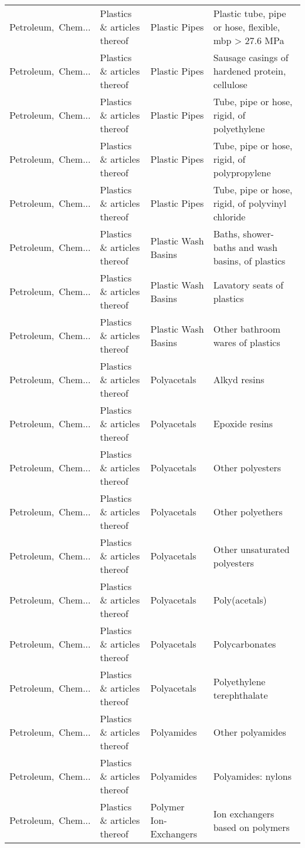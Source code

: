 \begin{appendices}
\begin{xltabular}{\textwidth}{|p{0.10\textwidth}|p{0.25\textwidth}|p{0.24\textwidth}|p{0.31\textwidth}|}
Petroleum,\ Chem... & Plastics \& articles thereof & Plastic Pipes & Plastic tube, pipe or hose, flexible, mbp > 27.6 MPa \\
Petroleum,\ Chem... & Plastics \& articles thereof & Plastic Pipes & Sausage casings of hardened protein, cellulose \\
Petroleum,\ Chem... & Plastics \& articles thereof & Plastic Pipes & Tube, pipe or hose, rigid, of polyethylene \\
Petroleum,\ Chem... & Plastics \& articles thereof & Plastic Pipes & Tube, pipe or hose, rigid, of polypropylene \\
Petroleum,\ Chem... & Plastics \& articles thereof & Plastic Pipes & Tube, pipe or hose, rigid, of polyvinyl chloride \\
Petroleum,\ Chem... & Plastics \& articles thereof & Plastic Wash Basins & Baths, shower-baths and wash basins, of plastics \\
Petroleum,\ Chem... & Plastics \& articles thereof & Plastic Wash Basins & Lavatory seats of plastics \\
Petroleum,\ Chem... & Plastics \& articles thereof & Plastic Wash Basins & Other bathroom wares of plastics \\
Petroleum,\ Chem... & Plastics \& articles thereof & Polyacetals & Alkyd resins \\
Petroleum,\ Chem... & Plastics \& articles thereof & Polyacetals & Epoxide resins \\
Petroleum,\ Chem... & Plastics \& articles thereof & Polyacetals & Other polyesters \\
Petroleum,\ Chem... & Plastics \& articles thereof & Polyacetals & Other polyethers \\
Petroleum,\ Chem... & Plastics \& articles thereof & Polyacetals & Other unsaturated polyesters \\
Petroleum,\ Chem... & Plastics \& articles thereof & Polyacetals & Poly(acetals) \\
Petroleum,\ Chem... & Plastics \& articles thereof & Polyacetals & Polycarbonates \\
Petroleum,\ Chem... & Plastics \& articles thereof & Polyacetals & Polyethylene terephthalate \\
Petroleum,\ Chem... & Plastics \& articles thereof & Polyamides & Other polyamides \\
Petroleum,\ Chem... & Plastics \& articles thereof & Polyamides & Polyamides: nylons \\
Petroleum,\ Chem... & Plastics \& articles thereof & Polymer Ion-Exchangers & Ion exchangers based on polymers \\

\end{xltabular}
\end{appendices}
